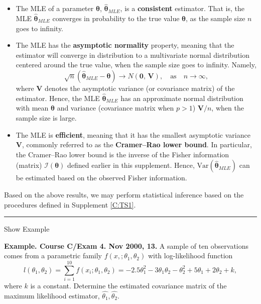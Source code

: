 \documentclass[]{book}
\theoremstyle{definition}
\theoremstyle{definition}
\theoremstyle{definition}
\theoremstyle{remark}
\begin{document}
\begin{itemize}
\item
  The MLE of a parameter \(\boldsymbol{\theta}\),
  \(\hat{\boldsymbol{\theta}}_{MLE}\), is a \textbf{consistent}
  estimator. That is, the MLE \(\hat{\boldsymbol{\theta}}_{MLE}\)
  converges in probability to the true value \(\boldsymbol{\theta}\), as
  the sample size \(n\) goes to infinity.
\item
  The MLE has the \textbf{asymptotic normality} property, meaning that
  the estimator will converge in distribution to a multivariate normal
  distribution centered around the true value, when the sample size goes
  to infinity. Namely,
  \[\sqrt{n}(\hat{\boldsymbol{\theta}}_{MLE}-\boldsymbol{\theta})\rightarrow N\left(\mathbf 0,\,\boldsymbol{V}\right),\quad \mbox{as}\quad n\rightarrow \infty,\]
  where \(\boldsymbol{V}\) denotes the asymptotic variance (or
  covariance matrix) of the estimator. Hence, the MLE
  \(\hat{\boldsymbol{\theta}}_{MLE}\) has an approximate normal
  distribution with mean \(\boldsymbol{\theta}\) and variance
  (covariance matrix when \(p>1\)) \(\boldsymbol{V}/n\), when the sample
  size is large.
\item
  The MLE is \textbf{efficient}, meaning that it has the smallest
  asymptotic variance \(\boldsymbol{V}\), commonly referred to as the
  \textbf{Cramer--Rao lower bound}. In particular, the Cramer--Rao lower
  bound is the inverse of the Fisher information (matrix)
  \(\mathcal{I}(\boldsymbol{\theta})\) defined earlier in this
  supplement. Hence, \(\mathrm{Var}(\hat{\boldsymbol{\theta}}_{MLE})\)
  can be estimated based on the observed Fisher information.
\end{itemize}

Based on the above results, we may perform statistical inference based
on the procedures defined in Supplement \ref{C:TS1}.

\begin{center}\rule{0.5\linewidth}{\linethickness}\end{center}

Show Example

\hypertarget{EXM:S2b:COV}{}
\textbf{Example. Course C/Exam 4. Nov 2000, 13.} A sample of ten
observations comes from a parametric family
\(f(x,; \theta_1, \theta_2)\) with log-likelihood function
\[l(\theta_1, \theta_2)= \sum_{i=1}^{10} f(x_i; \theta_1, \theta_2) = -2.5 \theta_1^2 - 3
    \theta_1 \theta_2 - \theta_2^2 + 5 \theta_1 + 2 \theta_2 + k,\]
where \(k\) is a constant. Determine the estimated covariance matrix of
the maximum likelihood estimator, \(\hat{\theta_1}, \hat{\theta_2}\).
\end{document}
